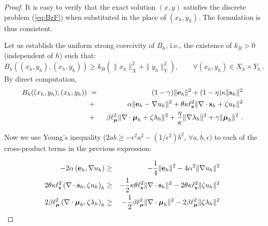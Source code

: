 \begin{proof}
	It is easy to verify that the exact solution $(x,y)$ satisfies the discrete problem (\ref{eq:BzF}) when substituted in the place of $(x_h,y_h)$. The formulation is thus consistent.
	
	Let us establish the uniform strong coercivity of $B_h$, i.e., the existence of $k_{B}>0$ (independent of $h$) such that:
	\begin{equation}
		B_h((x_h,y_h),(x_h,y_h))\geq k_B \left ( \|x_h\|_X^2 + \|y_h\|_Y^2 \right ),\qquad \forall (x_h,y_h)\in X_h\times Y_h~.
	\end{equation}
	By direct computation, 
	\begin{eqnarray}
		B_h((x_h,y_h),(x_h,y_h)) ~&=&~ (1-\gamma) \|\mathbf{e}_h\|^2 + (1-\eta)\kappa \|\mathbf{s}_h\|^2 \nonumber \\
		~&+&~ \alpha \|\mathbf{e}_h-\nabla u_h\|^2 + \theta \kappa \ell_{\mathbf{s}}^2 \|\nabla \cdot \mathbf{s}_h + \zeta u_h\|^2 \nonumber \\
		~&+&~ \beta \ell_{\boldsymbol{\mu}}^2 \| \nabla \cdot \boldsymbol{\mu}_h + \zeta \lambda_h \|^2
		+ \frac{\eta}{\kappa} \|\nabla \lambda_h\|^2 + \gamma \|\boldsymbol{\mu}_h\|^2~.
	\end{eqnarray}
	
	Now we use Young's inequality ($2ab\geq -\epsilon^2 a^2-(1/\epsilon^2)b^2$, $\forall a,b, \epsilon$) to each of the cross-product terms in the previous expression:
	
	\begin{eqnarray}
		-2\alpha \left (\mathbf{e}_h,\nabla u_h \right ) & \geq & -\frac14 \|\mathbf{e}_h\|^2 - 4\alpha^2 \|\nabla u_h \|^2 \\
		2\theta\kappa \ell_{\mathbf{s}}^2\left ( \nabla \cdot \mathbf{s}_h, \zeta u_h \right )_h& \geq & - \frac12 \kappa \theta \ell_{\mathbf{s}}^2 \|\nabla\cdot \mathbf{s}_h\|^2 - {2\theta\kappa\ell_{\mathbf{s}}^2}\|\zeta u_h\|^2\\
		2 \beta \ell_{\boldsymbol{\mu}}^2\left ( \nabla \cdot \boldsymbol{\mu}_h, \zeta \lambda_h \right )_h& \geq & - \frac12 {\beta} \ell_{\boldsymbol{\mu}}^2 \|\nabla\cdot \boldsymbol{\mu}_h\|^2 - {2\beta\ell_{\boldsymbol{\mu}}^2}\|\zeta \lambda_h\|^2
	\end{eqnarray}
	

\end{proof}
